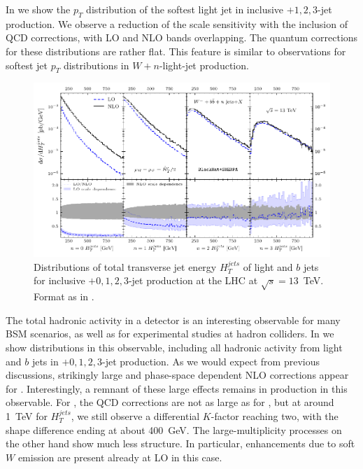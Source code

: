 In  we show the $p_T$ distribution of the softest light jet in
inclusive \Wbbp{}$+1,2,3$-jet production.
We observe a reduction of the scale
sensitivity with the inclusion of QCD corrections, with LO
and NLO bands overlapping. The quantum corrections for these
distributions are rather flat. This feature is similar to
observations for softest jet $p_T$ distributions in $W+n$-light-jet
production.


\begin{figure}[ht]
\centering
\includegraphics[clip,scale=1.0]{plots/htjets.pdf}
  \caption{Distributions of total transverse jet energy
    $H_T^{jets}$ of light and $b$ jets for inclusive \Wbbm$+0,1,2,3$-jet
    production at the LHC at $\sqrt{s}=13$~TeV. Format as in .}
  \label{fig_Wmnjht}
\end{figure}

The total hadronic activity in a detector is an interesting observable
for many BSM scenarios, as well as for
experimental studies at hadron colliders. In  we show distributions in
this observable, including all hadronic activity from light and $b$ jets in
\Wbbm$+0,1,2,3$-jet production. As we would expect from previous
discussions, strikingly large and phase-space dependent NLO
corrections appear for \Wbb{}. Interestingly, a remnant of these large effects remains in \Wbbnj[1]{}
production in this observable. For \Wbbnj[1]{}, the QCD corrections are
not as large as for \Wbb{}, but at around 1~TeV for $H_T^{jets}$, we
still observe a differential $K$-factor reaching two, with the shape difference ending at about 400~GeV. The large-multiplicity processes on the other hand show much less
structure. In particular, enhancements due to soft $W$ emission are present already at LO in this case.

